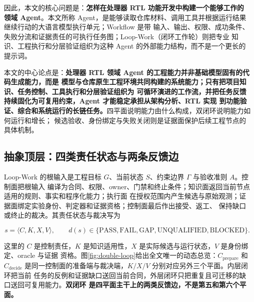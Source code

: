\documentclass[UTF8,a4paper,zihao=-4,oneside]{ctexart}
\begin{document}
因此，本文的核心问题是：\textbf{怎样在处理器 RTL 功能开发中构建一个能够工作的领域 Agent}。本文所称
Agent，是能够读取仓库材料、调用工具并根据运行结果继续行动的大语言模型执行单元；Workflow 是带
输入、输出、权限、成功条件、失败分流和证据责任的可执行任务图；Loop-Work（闭环工作轮）则把专业
知识、工程执行和分层验证组织为这种 Agent 的外部能力结构，而不是一个更长的提示词。

本文的中心论点是：\textbf{处理器 RTL 领域 Agent 的工程能力并非基础模型固有的代码生成能力，而是
模型与仓库原生工程环境共同构建的系统能力；只有把项目知识、任务控制、工具执行和分层验证组织为
可循环演进的工作流，并把任务反馈持续固化为可复用约束，Agent 才能稳定承担从架构分析、RTL 实现
到功能验证、综合和系统运行的长链任务。}四平面说明能力由什么构成，双闭环说明能力如何运行和增长；
候选验收、身份绑定与失败关闭则是证据面保护后续工程节点的具体机制。

\subsection{抽象顶层：四类责任状态与两条反馈边}

Loop-Work 的根输入是工程目标 $G$、当前状态 $S$、约束边界 $\Gamma$ 与验收准则 $A$。控制面把根输入
编译为合同、权限、owner、门禁和终止条件；知识面返回当前节点适用的规则、事实和程序化能力；执行面
在授权范围内产生候选与原始观测；证据面绑定实验身份、判定器和证据资格；控制面最后作出接受、返工、
保持缺口或终止的裁决。其责任状态与裁决写为

\[
s=\langle C,K,X,V\rangle,\qquad
d(s)\in\{\mathrm{PASS},\mathrm{FAIL},\mathrm{GAP},\mathrm{UNQUALIFIED},\mathrm{BLOCKED}\}.
\]

这里的 $C$ 是控制责任，$K$ 是知识适用性，$X$ 是实际候选与运行状态，$V$ 是身份绑定、oracle 与证据
资格。图\ref{fig:double-loop}给出全文唯一的动态总览：$C_{\mathrm{prepare}}$ 和
$C_{\mathrm{decide}}$ 是同一控制面的准备端与裁决端，$K/X/V$ 分别对应另外三个平面。内层闭环把当前
任务的反例和证据缺口送回当前合同，外层闭环只把重复且可迁移的缺口送回可复用能力。\textbf{双闭环
是四平面主干上的两类反馈边，不是第五和第六个平面。}
\end{document}
